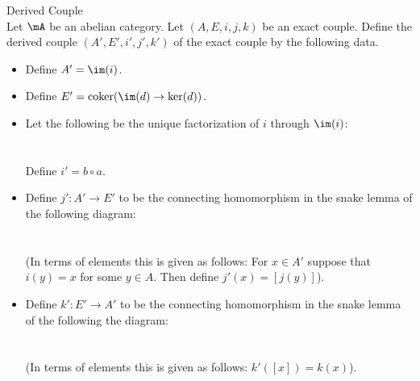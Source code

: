\documentclass[a4paper]{article}
\begin{document}
\begin{defn}{Derived Couple}{}\\
Let $\mA$ be an abelian category. Let $(A,E,i,j,k)$ be an exact couple. Define the derived couple $(A',E',i',j',k')$ of the exact couple by the following data. 
\begin{itemize}
\item Define $A'=\im(i)$. 
\item Define $E'=\text{coker}(\im(d)\to\ker(d))$. 
\item Let the following be the unique factorization of $i$ through $\im(i)$: \\~\\
\\
Define $i'=b\circ a$. 
\item Define $j':A'\to E'$ to be the connecting homomorphism in the snake lemma of the following diagram: \\~\\
\\
(In terms of elements this is given as follows: For $x\in A'$ suppose that $i(y)=x$ for some $y\in A$. Then define $j'(x)=[j(y)]$). 
\item Define $k':E'\to A'$ to be the connecting homomorphism in the snake lemma of the following the diagram: \\~\\
\\
(In terms of elements this is given as follows: $k'([x])=k(x)$). 
\end{itemize}
\end{defn}
\end{document}
